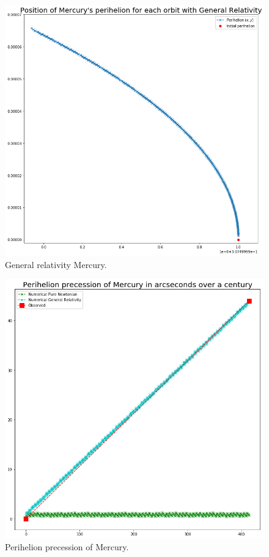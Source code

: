 \documentclass[a4paper, fontsize=11pt]{article}
\begin{document}
\begin{figure}[H]
\centering
\includegraphics[scale=0.5]{plots/GeneralRelativityMercury}
\caption{General relativity Mercury.}
\label{GRMercury}
\end{figure}


\begin{figure}[H]
\centering
\includegraphics[scale=0.5]{plots/PerihelionPrecessionMercury}
\caption{Perihelion precession of Mercury.}
\label{PerihelionMercury}
\end{figure}
\end{document}
